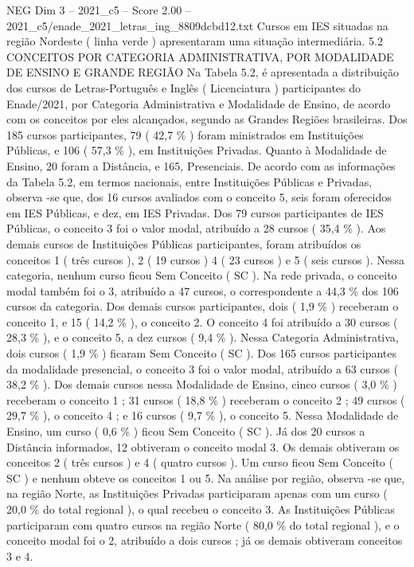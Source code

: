 \begin{textsample}{NEG Dim 3 – 2021\_c5 – Score 2.00 – 2021\_c5/enade\_2021\_letras\_ing\_8809dcbd12.txt}
Cursos em IES situadas na região Nordeste ( linha verde ) apresentaram uma situação intermediária. 5.2 CONCEITOS POR CATEGORIA ADMINISTRATIVA, POR MODALIDADE DE ENSINO E GRANDE REGIÃO Na Tabela 5.2, é apresentada a distribuição dos cursos de Letras-Português e Inglês ( Licenciatura ) participantes do Enade/2021, por Categoria Administrativa e Modalidade de Ensino, de acordo com os conceitos por eles alcançados, segundo as Grandes Regiões brasileiras.
Dos 185 cursos participantes, 79 ( 42,7 \% ) foram ministrados em Instituições Públicas, e 106 ( 57,3 \% ), em Instituições Privadas.
Quanto à Modalidade de Ensino, 20 foram a Distância, e 165, Presenciais.
De acordo com as informações da Tabela 5.2, em termos nacionais, entre Instituições Públicas e Privadas, observa -se que, dos 16 cursos avaliados com o conceito 5, seis foram oferecidos em IES Públicas, e dez, em IES Privadas.
Dos 79 cursos participantes de IES Públicas, o conceito 3 foi o valor modal, atribuído a 28 cursos ( 35,4 \% ).
Aos demais cursos de Instituições Públicas participantes, foram atribuídos os conceitos 1 ( três cursos ), 2 ( 19 cursos ) 4 ( 23 cursos ) e 5 ( seis cursos ).
Nessa categoria, nenhum curso ficou Sem Conceito ( SC ).
Na rede privada, o conceito modal também foi o 3, atribuído a 47 cursos, o correspondente a 44,3 \% dos 106 cursos da categoria.
Dos demais cursos participantes, dois ( 1,9 \% ) receberam o conceito 1, e 15 ( 14,2 \% ), o conceito 2.
O conceito 4 foi atribuído a 30 cursos ( 28,3 \% ), e o conceito 5, a dez cursos ( 9,4 \% ).
Nessa Categoria Administrativa, dois cursos ( 1,9 \% ) ficaram Sem Conceito ( SC ).
Dos 165 cursos participantes da modalidade presencial, o conceito 3 foi o valor modal, atribuído a 63 cursos ( 38,2 \% ).
Dos demais cursos nessa Modalidade de Ensino, cinco cursos ( 3,0 \% ) receberam o conceito 1 ; 31 cursos ( 18,8 \% ) receberam o conceito 2 ; 49 cursos ( 29,7 \% ), o conceito 4 ; e 16 cursos ( 9,7 \% ), o conceito 5.
Nessa Modalidade de Ensino, um curso ( 0,6 \% ) ficou Sem Conceito ( SC ).
Já dos 20 cursos a Distância informados, 12 obtiveram o conceito modal 3.
Os demais obtiveram os conceitos 2 ( três cursos ) e 4 ( quatro cursos ).
Um curso ficou Sem Conceito ( SC ) e nenhum obteve os conceitos 1 ou 5.
Na análise por região, observa -se que, na região Norte, as Instituições Privadas participaram apenas com um curso ( 20,0 \% do total regional ), o qual recebeu o conceito 3.
As Instituições Públicas participaram com quatro cursos na região Norte ( 80,0 \% do total regional ), e o conceito modal foi o 2, atribuído a dois cursos ; já os demais obtiveram conceitos 3 e 4.

\end{textsample}
